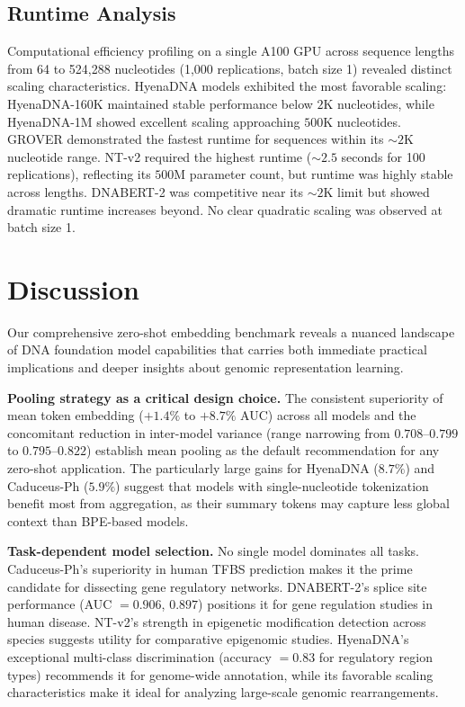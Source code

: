\documentclass[11pt]{article}
\begin{document}
\subsection{Runtime Analysis}

Computational efficiency profiling on a single A100 GPU across sequence lengths from 64 to 524,288 nucleotides (1,000 replications, batch size 1) revealed distinct scaling characteristics. HyenaDNA models exhibited the most favorable scaling: HyenaDNA-160K maintained stable performance below $2$K nucleotides, while HyenaDNA-1M showed excellent scaling approaching $500$K nucleotides. GROVER demonstrated the fastest runtime for sequences within its ${\sim}2$K nucleotide range. NT-v2 required the highest runtime (${\sim}2.5$ seconds for 100 replications), reflecting its $500$M parameter count, but runtime was highly stable across lengths. DNABERT-2 was competitive near its ${\sim}2$K limit but showed dramatic runtime increases beyond. No clear quadratic scaling was observed at batch size 1.

\section{Discussion}

Our comprehensive zero-shot embedding benchmark reveals a nuanced landscape of DNA foundation model capabilities that carries both immediate practical implications and deeper insights about genomic representation learning.

\textbf{Pooling strategy as a critical design choice.} The consistent superiority of mean token embedding ($+1.4\%$ to $+8.7\%$ AUC) across all models and the concomitant reduction in inter-model variance (range narrowing from $0.708$--$0.799$ to $0.795$--$0.822$) establish mean pooling as the default recommendation for any zero-shot application. The particularly large gains for HyenaDNA ($8.7\%$) and Caduceus-Ph ($5.9\%$) suggest that models with single-nucleotide tokenization benefit most from aggregation, as their summary tokens may capture less global context than BPE-based models.

\textbf{Task-dependent model selection.} No single model dominates all tasks. Caduceus-Ph's superiority in human TFBS prediction makes it the prime candidate for dissecting gene regulatory networks. DNABERT-2's splice site performance (AUC $= 0.906$, $0.897$) positions it for gene regulation studies in human disease. NT-v2's strength in epigenetic modification detection across species suggests utility for comparative epigenomic studies. HyenaDNA's exceptional multi-class discrimination (accuracy $= 0.83$ for regulatory region types) recommends it for genome-wide annotation, while its favorable scaling characteristics make it ideal for analyzing large-scale genomic rearrangements.
\end{document}
